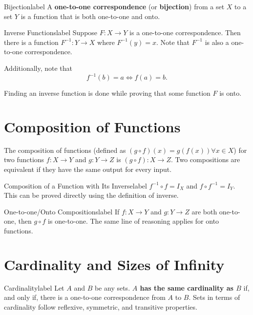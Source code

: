 \documentclass[a4paper]{report}
\begin{document}
\begin{definition}{Bijection}{label}
    A \textbf{one-to-one correspondence} (or \textbf{bijection}) from a set $X$ to a set $Y$ is
    a function that is both one-to-one and onto.
\end{definition}

\begin{theorem}{Inverse Functions}{label}
    Suppose $F: X \to Y$ is a one-to-one correspondence. Then there is a function $F^{-1}: Y \to X$
    where $F^{-1}(y)=x$. Note that $F^{-1}$ is also a one-to-one correspondence.

    Additionally, note that \[
        f^{-1}(b) = a \Leftrightarrow f(a) = b
    .\] 
\end{theorem}

Finding an inverse function is done while proving that some function $F$ is onto.

\section{Composition of Functions}

The composition of functions (defined as $(g \circ f)(x) = g(f(x)) \forall x \in X$) for two
functions $f: X \to Y$ and $g: Y \to Z$ is $(g \circ f): X \to Z$.
Two compositions are equivalent if they have the same output for every input.

\begin{theorem}{Composition of a Function with Its Inverse}{label}
    $f^{-1} \circ f = I_X$ and $f \circ f^{-1} = I_Y$. This can be proved directly using the
    definition of inverse.
\end{theorem}

\begin{theorem}{One-to-one/Onto Compositions}{label}
    If $f: X \to Y$ and $g: Y \to Z$ are both one-to-one, then $g \circ f$ is one-to-one.
    The same line of reasoning applies for onto functions.
\end{theorem}

\section{Cardinality and Sizes of Infinity}

\begin{definition}{Cardinality}{label}
    Let $A$ and $B$ be any sets. \textbf{$A$ has the same cardinality as $B$} if, and only if, there is
    a one-to-one correspondence from $A$ to $B$. Sets in terms of cardinality follow reflexive,
    symmetric, and transitive properties.
\end{definition}
\end{document}
